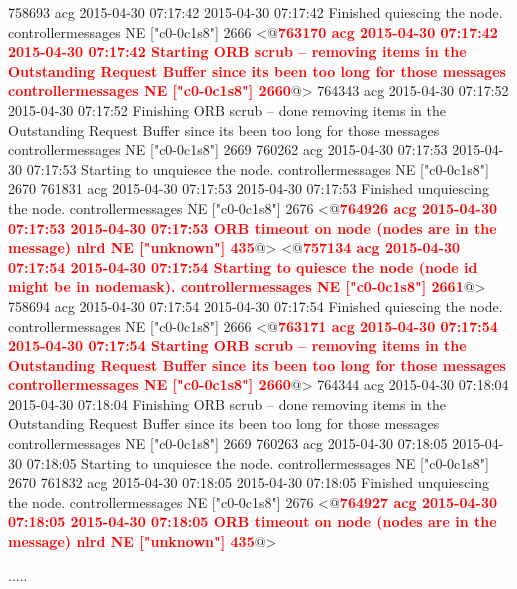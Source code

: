 \begin{figure*}
\begin{annol}
758693	acg	2015-04-30 07:17:42	2015-04-30 07:17:42		Finished quiescing the node.		controllermessages	NE	["c0-0c1s8"]	2666
<@\textbf{\textcolor{red}{763170	acg	2015-04-30 07:17:42	2015-04-30 07:17:42		Starting ORB scrub -- removing items in the Outstanding Request Buffer since its been too long for those messages	controllermessages	NE	["c0-0c1s8"]	2660}}@>
764343	acg	2015-04-30 07:17:52	2015-04-30 07:17:52		Finishing ORB scrub -- done removing items in the Outstanding Request Buffer since its been too long for those messages	controllermessages	NE	["c0-0c1s8"]	2669
760262	acg	2015-04-30 07:17:53	2015-04-30 07:17:53		Starting to unquiesce the node.		controllermessages	NE	["c0-0c1s8"]	2670
761831	acg	2015-04-30 07:17:53	2015-04-30 07:17:53		Finished unquiescing the node.		controllermessages	NE	["c0-0c1s8"]	2676
<@\textbf{\textcolor{red}{764926	acg	2015-04-30 07:17:53	2015-04-30 07:17:53		ORB timeout on node (nodes are in the message)		nlrd	NE	["unknown"]	435}}@>
<@\textbf{\textcolor{red}{757134	acg	2015-04-30 07:17:54	2015-04-30 07:17:54		Starting to quiesce the node (node id might be in nodemask).		controllermessages	NE	["c0-0c1s8"]	2661}}@>
758694	acg	2015-04-30 07:17:54	2015-04-30 07:17:54		Finished quiescing the node.		controllermessages	NE	["c0-0c1s8"]	2666
<@\textbf{\textcolor{red}{763171	acg	2015-04-30 07:17:54	2015-04-30 07:17:54		Starting ORB scrub -- removing items in the Outstanding Request Buffer since its been too long for those messages	controllermessages	NE	["c0-0c1s8"]	2660}}@>
764344	acg	2015-04-30 07:18:04	2015-04-30 07:18:04		Finishing ORB scrub -- done removing items in the Outstanding Request Buffer since its been too long for those messages	controllermessages	NE	["c0-0c1s8"]	2669
760263	acg	2015-04-30 07:18:05	2015-04-30 07:18:05		Starting to unquiesce the node.		controllermessages	NE	["c0-0c1s8"]	2670
761832	acg	2015-04-30 07:18:05	2015-04-30 07:18:05		Finished unquiescing the node.		controllermessages	NE	["c0-0c1s8"]	2676
<@\textbf{\textcolor{red}{764927	acg	2015-04-30 07:18:05	2015-04-30 07:18:05		ORB timeout on node (nodes are in the message)		nlrd	NE	["unknown"]	435}}@>

.....


\end{annol}
\end{figure*}
